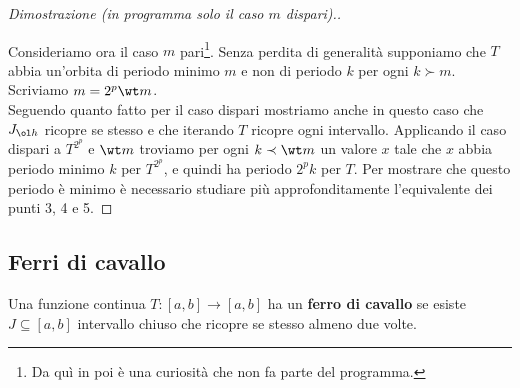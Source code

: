 \begin{proof}[Dimostrazione (in programma solo il caso $m$ dispari).]
\begin{enumerate}
\end{enumerate}
Consideriamo ora il caso $m$ pari\footnote{Da qu\`i in poi \`e una curiosit\`a che non fa parte del programma.}.
Senza perdita di generalit\`a supponiamo che $T$ abbia un'orbita di periodo minimo $m$ e non di periodo $k$ per ogni $k\succ m$. Scriviamo $m=2^p\wt m$.\\
Seguendo quanto fatto per il caso dispari mostriamo anche in questo caso che $J_{\ol h}$ ricopre se stesso e che iterando $T$ ricopre ogni intervallo. Applicando il caso dispari a $T^{2^p}$ e $\wt m$ troviamo per ogni $k\prec \wt m$ un valore $x$ tale che $x$ abbia periodo minimo $k$ per $T^{2^p}$, e quindi ha periodo $2^pk$ per $T$. Per mostrare che questo periodo \`e minimo \`e necessario studiare pi\`u approfonditamente l'equivalente dei punti 3, 4 e 5.
\end{proof}

\subsection{Ferri di cavallo}
\begin{definition}
Una funzione continua $T:[a,b]\to[a,b]$ ha un \textbf{ferro di cavallo} se esiste $J\subseteq [a,b]$ intervallo chiuso che ricopre se stesso almeno due volte.
\end{definition}

